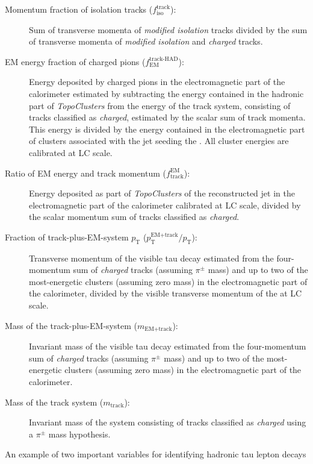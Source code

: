 \begin{description}
\item[Momentum fraction of isolation tracks ($f_\text{iso}^\text{track}$):] Sum
  of transverse momenta of \emph{modified isolation} tracks divided by the sum
  of transverse momenta of \emph{modified isolation} and \emph{charged} tracks.

\item[EM energy fraction of charged pions ($f_\text{EM}^\text{track-HAD}$):]
  Energy deposited by charged pions in the electromagnetic part of the
  calorimeter estimated by subtracting the energy contained in the hadronic part
  of \emph{TopoClusters} from the energy of the track system, consisting of
  tracks classified as \emph{charged}, estimated by the scalar sum of track
  momenta. This energy is divided by the energy contained in the electromagnetic
  part of clusters associated with the jet seeding the \tauhadvis. All cluster
  energies are calibrated at LC scale.

\item[Ratio of EM energy and track momentum ($f_\text{track}^\text{EM}$):]
  Energy deposited as part of \emph{TopoClusters} of the reconstructed jet in
  the electromagnetic part of the calorimeter calibrated at LC scale, divided by
  the scalar momentum sum of tracks classified as \emph{charged}.

\item[Fraction of track-plus-EM-system $p_\text{T}$
  ($p_\text{T}^\text{EM+track} / p_\text{T}$):] Transverse momentum of the
  visible tau decay estimated from the four-momentum sum of \emph{charged}
  tracks (assuming $\pi^\pm$ mass) and up to two of the most-energetic clusters
  (assuming zero mass) in the electromagnetic part of the calorimeter, divided
  by the visible transverse momentum of the \tauhadvis at LC scale.

\item[Mass of the track-plus-EM-system ($m_\text{EM+track}$):] Invariant mass of
  the visible tau decay estimated from the four-momentum sum of \emph{charged}
  tracks (assuming $\pi^\pm$ mass) and up to two of the most-energetic clusters
  (assuming zero mass) in the electromagnetic part of the calorimeter.

\item[Mass of the track system ($m_\text{track}$):] Invariant mass of the system
  consisting of tracks classified as \emph{charged} using a $\pi^\pm$ mass
  hypothesis.
\end{description}
An example of two important variables for identifying hadronic tau lepton decays
